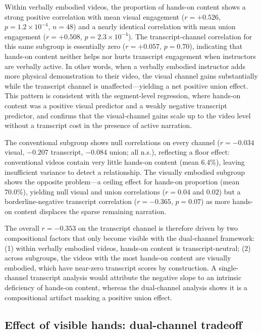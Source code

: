 \documentclass[fleqn,10pt]{wlscirep}
\begin{document}
Within verbally embodied videos, the proportion of hands-on content shows a strong positive correlation with mean visual engagement ($r = +0.526$, $p = 1.2 \times 10^{-4}$, $n = 48$) and a nearly identical correlation with mean union engagement ($r = +0.508$, $p = 2.3 \times 10^{-4}$). The transcript-channel correlation for this same subgroup is essentially zero ($r = +0.057$, $p = 0.70$), indicating that hands-on content neither helps nor hurts transcript engagement when instructors are verbally active. In other words, when a verbally embodied instructor adds more physical demonstration to their video, the visual channel gains substantially while the transcript channel is unaffected---yielding a net positive union effect. This pattern is consistent with the segment-level regression, where hands-on content was a positive visual predictor and a weakly negative transcript predictor, and confirms that the visual-channel gains scale up to the video level without a transcript cost in the presence of active narration.

The conventional subgroup shows null correlations on every channel ($r = -0.034$ visual, $-0.207$ transcript, $-0.084$ union; all n.s.), reflecting a floor effect: conventional videos contain very little hands-on content (mean 6.4\%), leaving insufficient variance to detect a relationship. The visually embodied subgroup shows the opposite problem---a ceiling effect for hands-on proportion (mean 70.0\%), yielding null visual and union correlations ($r = 0.04$ and $0.02$) but a borderline-negative transcript correlation ($r = -0.365$, $p = 0.07$) as more hands-on content displaces the sparse remaining narration.

The overall $r = -0.353$ on the transcript channel is therefore driven by two compositional factors that only become visible with the dual-channel framework: (1) within verbally embodied videos, hands-on content is transcript-neutral; (2) across subgroups, the videos with the most hands-on content are visually embodied, which have near-zero transcript scores by construction. A single-channel transcript analysis would attribute the negative slope to an intrinsic deficiency of hands-on content, whereas the dual-channel analysis shows it is a compositional artifact masking a positive union effect.


\subsection*{Effect of visible hands: dual-channel tradeoff}
\end{document}
